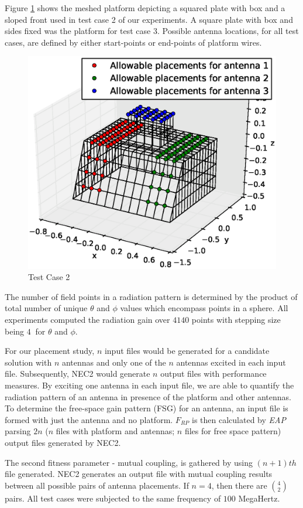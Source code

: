 \documentclass[conference]{IEEEtran}
\begin{document}
Figure \ref{fig:plat2} shows the meshed platform depicting a squared plate with box and a sloped front used in test case 2 of our experiments. A square plate with box and sides fixed was the platform for test case 3. Possible antenna locations, for all test cases, are defined by either start-points or end-points of platform wires.  
\begin{figure}
    \begin{center}
        \includegraphics[width=.41\textwidth]{FIG/tc_2_figure}
\end{center}
\caption{Test Case 2}
\label{fig:plat2}
\end{figure}

The number of field points in a radiation pattern is determined by the product of total number of unique $\theta$ and $\phi$ values which encompass points in a sphere. All experiments computed the radiation gain over $4140$ points with stepping size being $4$\textdegree $~$ for $\theta$ and $\phi$.

For our placement study, $n$ input files would be generated for a candidate solution with $n$ antennas and only one of the $n$ antennas excited in each input file. Subsequently, NEC2 would generate $n$ output files with performance measures. By exciting one antenna in each input file, we are able to quantify the radiation pattern of an antenna in presence of the platform and other antennas. To determine the free-space gain pattern (FSG) for an antenna, an input file is formed with just the antenna and no platform. $F_{RP}$ is then calculated by \textit{EAP} parsing $2n$ ($n$ files with platform and antennas; $n$ files for free space pattern) output files generated by NEC2.

The second fitness parameter - mutual coupling, is gathered by using $(n+1)th$ file generated. NEC2 generates an output file with mutual coupling results between all possible pairs of antenna placements. If $n=4$, then there are $\binom{4}{2}$ pairs. All test cases were subjected to the same frequency of $100$ MegaHertz.
\end{document}
